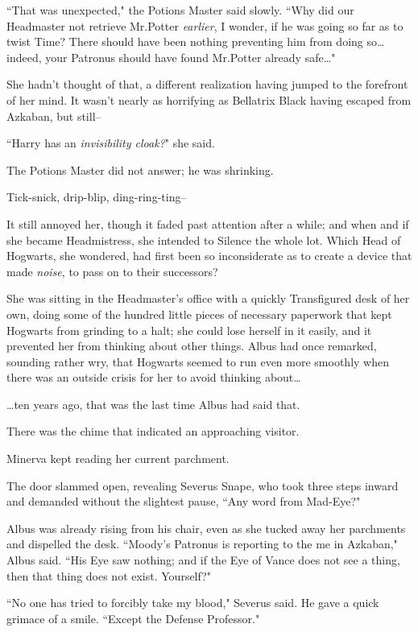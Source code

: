 ``That was unexpected," the Potions Master said slowly. ``Why did our Headmaster not retrieve Mr.\?Potter \emph{earlier}, I wonder, if he was going so far as to twist Time? There should have been nothing preventing him from doing so{\ldots} indeed, your Patronus should have found Mr.\?Potter already safe{\ldots}"

She hadn't thought of that, a different realization having jumped to the forefront of her mind. It wasn't nearly as horrifying as Bellatrix Black having escaped from Azkaban, but still\---

``Harry has an \emph{invisibility cloak?}" she said.

The Potions Master did not answer; he was shrinking.

\later

Tick-snick, drip-blip, ding-ring-ting\---

It still annoyed her, though it faded past attention after a while; and when and if she became Headmistress, she intended to Silence the whole lot. Which Head of Hogwarts, she wondered, had first been so inconsiderate as to create a device that made \emph{noise}, to pass on to their successors?

She was sitting in the Headmaster's office with a quickly Transfigured desk of her own, doing some of the hundred little pieces of necessary paperwork that kept Hogwarts from grinding to a halt; she could lose herself in it easily, and it prevented her from thinking about other things. Albus had once remarked, sounding rather wry, that Hogwarts seemed to run even more smoothly when there was an outside crisis for her to avoid thinking about{\ldots}

{\ldots}ten years ago, that was the last time Albus had said that.

There was the chime that indicated an approaching visitor.

Minerva kept reading her current parchment.

The door slammed open, revealing Severus Snape, who took three steps inward and demanded without the slightest pause, ``Any word from Mad-Eye?"

Albus was already rising from his chair, even as she tucked away her parchments and dispelled the desk. ``Moody's Patronus is reporting to the me in Azkaban," Albus said. ``His Eye saw nothing; and if the Eye of Vance does not see a thing, then that thing does not exist. Yourself?"

``No one has tried to forcibly take my blood," Severus said. He gave a quick grimace of a smile. ``Except the Defense Professor."

